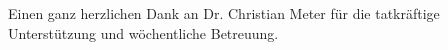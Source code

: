 \begin{center} 
    \huge {}
\end{center}

Einen ganz herzlichen Dank an Dr. Christian Meter für die tatkräftige
Unterstützung und wöchentliche Betreuung.